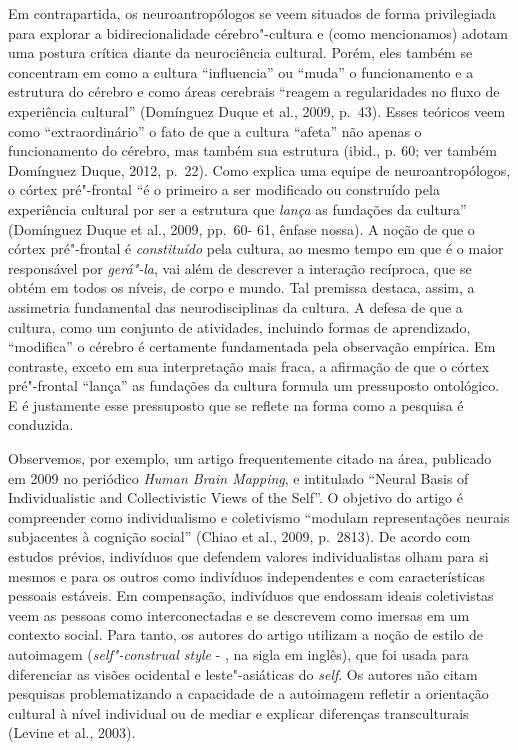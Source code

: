 Em contrapartida, os neuroantropólogos se veem situados de forma
privilegiada para explorar a bidirecionalidade cérebro"-cultura e (como
mencionamos) adotam uma postura crítica diante da neurociência cultural.
Porém, eles também se concentram em como a cultura ``influencia'' ou
``muda'' o funcionamento e a estrutura do cérebro e como áreas cerebrais
``reagem a regularidades no fluxo de experiência cultural'' (Domínguez
Duque et al., 2009, p.~43). Esses teóricos veem como ``extraordinário''
o fato de que a cultura ``afeta'' não apenas o funcionamento do cérebro,
mas também sua estrutura (ibid., p. 60; ver também Domínguez Duque,
2012, p.~22). Como explica uma equipe de neuroantropólogos, o córtex
pré"-frontal ``é o primeiro a ser modificado ou construído pela
experiência cultural por ser a estrutura que \emph{lança} as fundações
da cultura'' (Domínguez Duque et al., 2009, pp.~60- 61, ênfase nossa). A
noção de que o córtex pré"-frontal é \emph{constituído} pela cultura, ao
mesmo tempo em que é o maior responsável por \emph{gerá"-la}, vai além de
descrever a interação recíproca, que se obtém em todos os níveis, de
corpo e mundo. Tal premissa destaca, assim, a assimetria fundamental das
neurodisciplinas da cultura. A defesa de que a cultura, como um conjunto
de atividades, incluindo formas de aprendizado, ``modifica'' o cérebro é
certamente fundamentada pela observação empírica. Em contraste, exceto
em sua interpretação mais fraca, a afirmação de que o córtex pré"-frontal
``lança'' as fundações da cultura formula um pressuposto ontológico. E é
justamente esse pressuposto que se reflete na forma como a pesquisa é
conduzida.

Observemos, por exemplo, um artigo frequentemente citado na área,
publicado em 2009 no periódico \emph{Human Brain Mapping}, e intitulado
``Neural Basis of Individualistic and Collectivistic Views of the
Self''. O objetivo do artigo é compreender como individualismo e
coletivismo ``modulam representações neurais subjacentes à cognição
social'' (Chiao et al., 2009, p.~2813). De acordo com estudos prévios,
indivíduos que defendem valores individualistas olham para si mesmos e
para os outros como indivíduos independentes e com características
pessoais estáveis. Em compensação, indivíduos que endossam ideais
coletivistas veem as pessoas como interconectadas e se descrevem como
imersas em um contexto social. Para tanto, os autores do artigo utilizam
a noção de estilo de autoimagem (\emph{self"-construal style} - , na
sigla em inglês), que foi usada para diferenciar as visões ocidental e
leste"-asiáticas do \emph{self}. Os autores não citam pesquisas
problematizando a capacidade de a autoimagem refletir a orientação
cultural à nível individual ou de mediar e explicar diferenças
transculturais (Levine et al., 2003).

